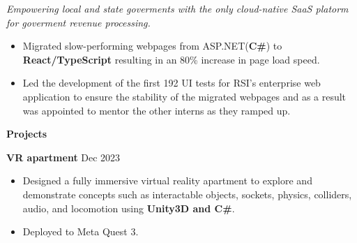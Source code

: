 \documentclass[10pt]{article}
\begin{document}
\textit{Empowering local and state goverments with the only cloud-native SaaS platorm for goverment revenue processing.}

\vspace{1pt}

\begin{itemize}[noitemsep]
    \item Migrated slow-performing webpages from ASP.NET(\textbf{C\#}) to \textbf{React/TypeScript} resulting in an 80\% increase in page load speed.
    \item Led the development of the first 192 UI tests for RSI's enterprise web application to ensure the stability of the migrated webpages and as a result was appointed to mentor the other interns as they ramped up.
\end{itemize}



\begin{center}
    \textbf{Projects}
    \hrulefill
\end{center}

\textbf{VR apartment} \hfill Dec 2023
\begin{itemize}[noitemsep]
    \item Designed a fully immersive virtual reality apartment to explore and demonstrate concepts such as interactable objects,
    sockets, physics, colliders, audio, and locomotion using \textbf{Unity3D and C\#}. 
    \item Deployed to Meta Quest 3.
\end{itemize}
\end{document}
